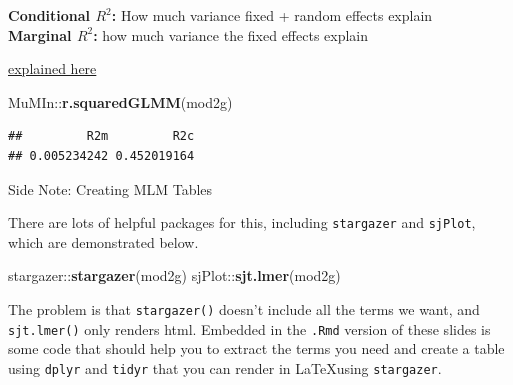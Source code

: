 \documentclass[ignorenonframetext,]{beamer}
\newenvironment{Shaded}{\begin{snugshade}}{\end{snugshade}}
\newcommand{\KeywordTok}[1]{\textcolor[rgb]{0.13,0.29,0.53}{\textbf{{#1}}}}
\newcommand{\NormalTok}[1]{{#1}}
\begin{document}
\begin{frame}[fragile]

\small
\textbf{Conditional $R^2$:} How much variance fixed + random effects
explain\\
\textbf{Marginal $R^2$:} how much variance the fixed effects explain

\href{https://jonlefcheck.net/2013/03/13/r2-for-linear-mixed-effects-models/}{explained
here}

\begin{Shaded}
\begin{Highlighting}[]
\NormalTok{MuMIn::}\KeywordTok{r.squaredGLMM}\NormalTok{(mod2g)}
\end{Highlighting}
\end{Shaded}

\begin{verbatim}
##         R2m         R2c 
## 0.005234242 0.452019164
\end{verbatim}

\normalsize

\end{frame}

\begin{frame}[fragile]{Side Note: Creating MLM Tables}

There are lots of helpful packages for this, including
\texttt{stargazer} and \texttt{sjPlot}, which are demonstrated below.\\
\small

\begin{Shaded}
\begin{Highlighting}[]
\NormalTok{stargazer::}\KeywordTok{stargazer}\NormalTok{(mod2g)}
\NormalTok{sjPlot::}\KeywordTok{sjt.lmer}\NormalTok{(mod2g)}
\end{Highlighting}
\end{Shaded}

\normalsize

The problem is that \texttt{stargazer()} doesn't include all the terms
we want, and \texttt{sjt.lmer()} only renders html. Embedded in the
\texttt{.Rmd} version of these slides is some code that should help you
to extract the terms you need and create a table using \texttt{dplyr}
and \texttt{tidyr} that you can render in \LaTeX using
\texttt{stargazer}.

\end{frame}
\end{document}
